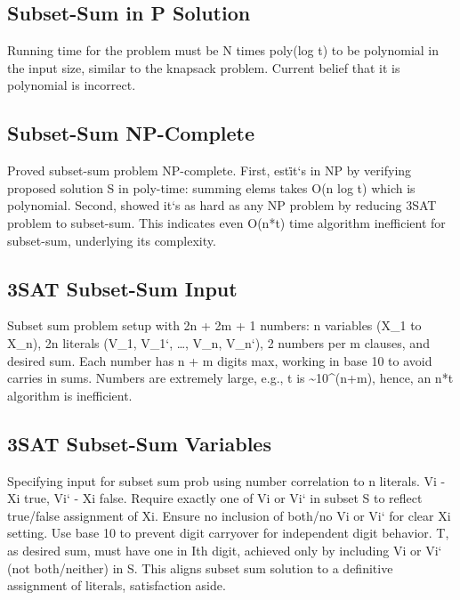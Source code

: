 \subsection*{Subset-Sum in P Solution}
Running time for the problem must be N times poly(log t) to be polynomial in the input size, similar to the knapsack problem.
Current belief that it is polynomial is incorrect.

\subsection*{Subset-Sum NP-Complete}
Proved subset-sum problem NP-complete.
First, est\. it`s in NP by verifying proposed solution S in poly-time: summing elems takes O(n log t) which is polynomial.
Second, showed it`s as hard as any NP problem by reducing 3SAT problem to subset-sum.
This indicates even O(n*t) time algorithm inefficient for subset-sum, underlying its complexity.

\subsection*{3SAT Subset-Sum  Input}
Subset sum problem setup with 2n + 2m + 1 numbers: n variables (X\_1 to X\_n), 2n literals (V\_1, V\_1`, \ldots, V\_n, V\_n`), 2 numbers per m clauses, and desired sum.
Each number has n + m digits max, working in base 10 to avoid carries in sums.
Numbers are extremely large, e.g., t is \textasciitilde{}10\textasciicircum{}(n+m), hence, an n*t algorithm is inefficient.

\subsection*{3SAT Subset-Sum  Variables}
Specifying input for subset sum prob using number correlation to n literals.
Vi - Xi true, Vi` - Xi false.
Require exactly one of Vi or Vi` in subset S to reflect true/false assignment of Xi.
Ensure no inclusion of both/no Vi or Vi` for clear Xi setting.
Use base 10 to prevent digit carryover for independent digit behavior.
T, as desired sum, must have one in Ith digit, achieved only by including Vi or Vi` (not both/neither) in S\@.
This aligns subset sum solution to a definitive assignment of literals, satisfaction aside.

